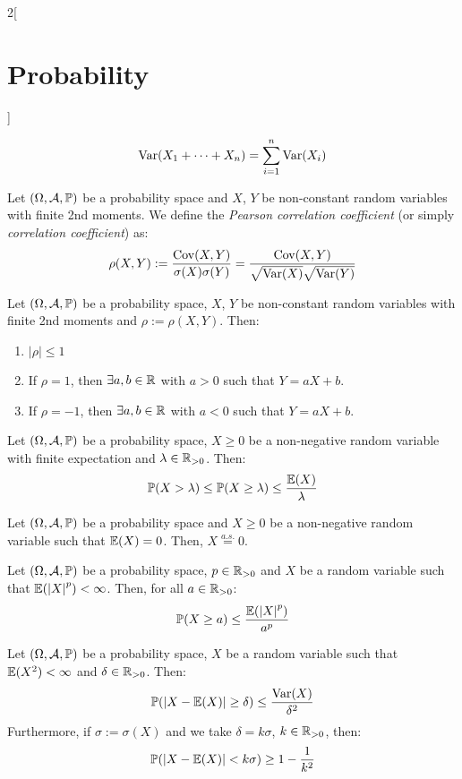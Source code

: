 \documentclass[../../../main.tex]{subfiles}
\begin{document}
\begin{multicols}{2}[\section{Probability}]
\begin{corollary}
    $$\operatorname{Var}(X_1+\cdots+X_n)=\sum_{i=1}^n\operatorname{Var}(X_i)$$
  \end{corollary}
  \begin{definition}
    Let $(\Omega,\mathcal{A},\mathbb{P})$ be a probability space and $X$, $Y$ be non-constant random variables with finite 2nd moments. We define the \textit{Pearson correlation coefficient} (or simply \textit{correlation coefficient}) as: $$\rho(X,Y):=\frac{\operatorname{Cov}(X,Y)}{\sigma(X)\sigma(Y)}=\frac{\operatorname{Cov}(X,Y)}{\sqrt{\operatorname{Var}(X)}\sqrt{\operatorname{Var}(Y)}}$$
  \end{definition}
  \begin{prop}
    Let $(\Omega,\mathcal{A},\mathbb{P})$ be a probability space, $X$, $Y$ be non-constant random variables with finite 2nd moments and $\rho:=\rho(X,Y)$. Then:
    \begin{enumerate}
      \item $|\rho|\leq 1$
      \item If $\rho=1$, then $\exists a,b\in\mathbb{R}$ with $a>0$ such that $Y=aX+b$.
      \item If $\rho=-1$, then $\exists a,b\in\mathbb{R}$ with $a<0$ such that $Y=aX+b$.
    \end{enumerate}
  \end{prop}
  \begin{theorem}
    Let $(\Omega,\mathcal{A},\mathbb{P})$ be a probability space, $X\geq 0$ be a non-negative random variable with finite expectation and $\lambda\in\mathbb{R}_{>0}$. Then:
    $$\mathbb{P}(X>\lambda)\leq \mathbb{P}(X\geq \lambda)\leq \frac{\mathbb{E}(X)}{\lambda}$$
  \end{theorem}
  \begin{corollary}
    Let $(\Omega,\mathcal{A},\mathbb{P})$ be a probability space and $X\geq 0$ be a non-negative random variable such that $\mathbb{E}(X)=0$. Then, $X\overset{a.s.}{=}0$.
  \end{corollary}
  \begin{corollary}
    Let $(\Omega,\mathcal{A},\mathbb{P})$ be a probability space, $p\in\mathbb{R}_{>0}$ and $X$ be a random variable such that $\mathbb{E}({|X|}^p)<\infty$. Then, for all $a\in\mathbb{R}_{>0}$: $$\mathbb{P}(X\geq a)\leq \frac{\mathbb{E}({|X|}^p)}{a^p}$$
  \end{corollary}
  \begin{corollary}
    Let $(\Omega,\mathcal{A},\mathbb{P})$ be a probability space, $X$ be a random variable such that $\mathbb{E}(X^2)<\infty$ and $\delta\in\mathbb{R}_{>0}$. Then: $$\mathbb{P}(|X-\mathbb{E}(X)|\geq\delta)\leq\frac{\operatorname{Var}(X)}{\delta^2}$$ Furthermore, if $\sigma:=\sigma(X)$ and we take $\delta=k\sigma$, $k\in\mathbb{R}_{>0}$, then: $$\mathbb{P}(|X-\mathbb{E}(X)|<k\sigma)\geq1-\frac{1}{k^2}$$

\end{corollary}
\end{multicols}
\end{document}
